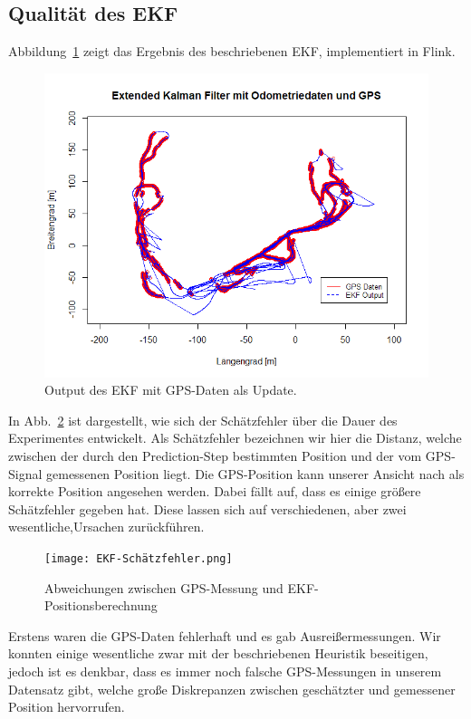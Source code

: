 \documentclass[11pt]{article}
\begin{document}
\subsection{Qualität des EKF}
Abbildung~\ref{EKF-Output} zeigt das Ergebnis des beschriebenen EKF, implementiert in Flink.
\begin{figure}[!t]
	\centering
	\includegraphics[width=5.5in]{EKF-output.png}
	\caption{Output des EKF mit GPS-Daten als Update.}
	\label{EKF-Output}
\end{figure}

In Abb.~\ref{EKF-Schätzfehler} ist dargestellt, wie sich der Schätzfehler über die Dauer des Experimentes entwickelt. Als Schätzfehler bezeichnen wir hier die Distanz, welche zwischen der durch den Prediction-Step bestimmten Position und der vom GPS-Signal gemessenen Position liegt. Die GPS-Position kann unserer Ansicht nach als korrekte Position angesehen werden. 
Dabei fällt auf, dass es einige größere Schätzfehler gegeben hat. Diese lassen sich auf verschiedenen, aber zwei wesentliche,Ursachen zurückführen.
\begin{figure}[!t]
	\centering
	\texttt{[image: EKF-Schätzfehler.png]}
	\caption{Abweichungen zwischen GPS-Messung und EKF-Positionsberechnung}
	\label{EKF-Schätzfehler}
\end{figure}

Erstens waren die GPS-Daten fehlerhaft und es gab Ausreißermessungen. Wir konnten einige wesentliche zwar mit der beschriebenen Heuristik beseitigen, jedoch ist es denkbar, dass es immer noch falsche GPS-Messungen in unserem Datensatz gibt, welche große Diskrepanzen zwischen geschätzter und gemessener Position hervorrufen.
\end{document}
